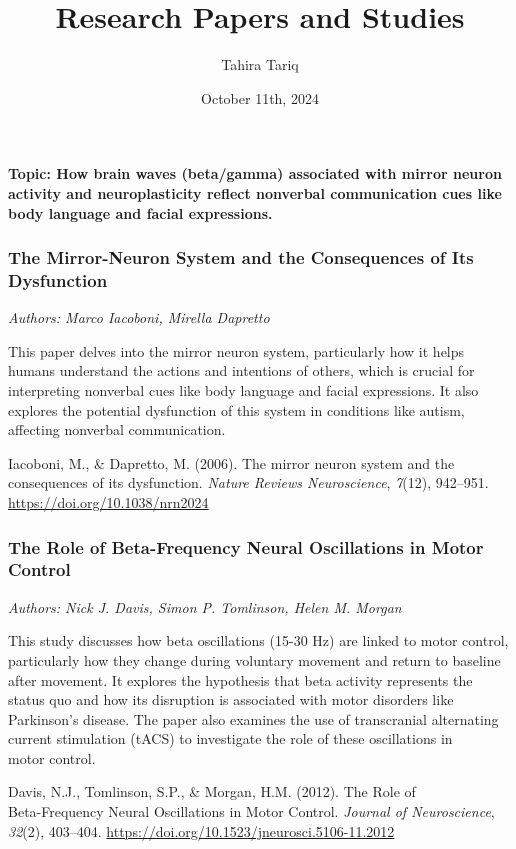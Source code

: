 \documentclass{article}
\title{Research Papers and Studies}
\author{Tahira Tariq}
\date{October 11th, 2024}
\begin{document}
\maketitle

\noindent\textbf{Topic: How brain waves (beta/gamma) associated with mirror neuron activity and neuroplasticity reflect nonverbal communication cues like body language and facial expressions.}

\subsubsection*{The Mirror-Neuron System and the Consequences of Its Dysfunction}
\textit{Authors: Marco Iacoboni, Mirella Dapretto}

This paper delves into the mirror neuron system, particularly how it helps humans understand the actions and intentions of others, which is crucial for interpreting nonverbal cues like body language and facial expressions. It also explores the potential dysfunction of this system in conditions like autism,\\affecting nonverbal communication.

Iacoboni, M., \& Dapretto, M. (2006). The mirror neuron system and the consequences of its dysfunction. \textit{Nature Reviews Neuroscience}, \textit{7}(12), 942–951. \href{https://doi.org/10.1038/nrn2024}{https://doi.org/10.1038/nrn2024}

\subsubsection*{The Role of Beta-Frequency Neural Oscillations in Motor Control}
\textit{Authors: Nick J. Davis, Simon P. Tomlinson, Helen M. Morgan}

This study discusses how beta oscillations (15-30 Hz) are linked to motor control, particularly how they change during voluntary movement and return to baseline after movement. It explores the hypothesis that beta activity represents the status quo and how its disruption is associated with motor disorders like Parkinson’s disease. The paper also examines the use of transcranial alternating current stimulation (tACS) to investigate the role of these oscillations in\\motor control.

Davis, N.J., Tomlinson, S.P., \& Morgan, H.M. (2012). The Role of\\Beta-Frequency Neural Oscillations in Motor Control. \textit{Journal of Neuroscience}, \textit{32}(2), 403–404. \href{https://doi.org/10.1523/jneurosci.5106-11.2012}{https://doi.org/10.1523/jneurosci.5106-11.2012}
\end{document}
